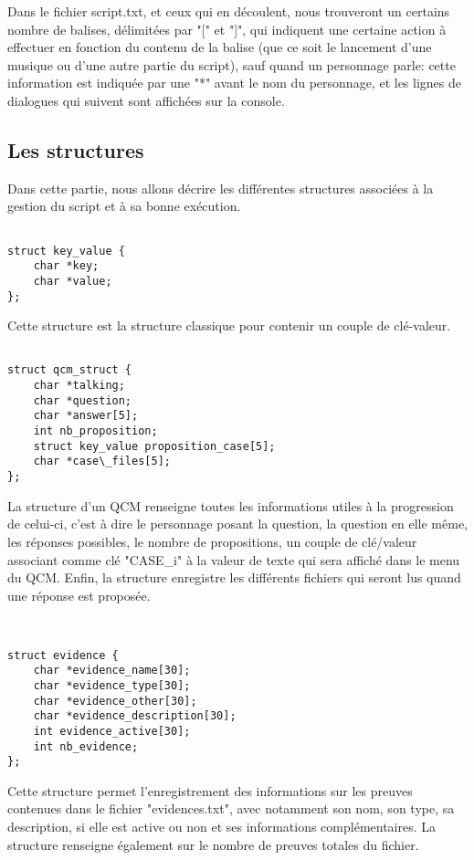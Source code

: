 	Dans le fichier script.txt, et ceux qui en découlent, nous trouveront un certains nombre de balises, délimitées par "[" et "]", qui indiquent une certaine action à effectuer en fonction du contenu de la balise (que ce soit le lancement d'une musique ou d'une autre partie du script), sauf quand un personnage parle: cette information est indiquée par une "*" avant le nom du personnage, et les lignes de dialogues qui suivent sont affichées sur la console.


\subsection{Les structures}

	Dans cette partie, nous allons décrire les différentes structures associées à la gestion du script et à sa bonne exécution.

\begin{verbatim}

struct key_value {
	char *key;
	char *value;
};
\end{verbatim}

	Cette structure est la structure classique pour contenir un couple de clé-valeur.

\begin{verbatim}

struct qcm_struct {
	char *talking;
	char *question;
	char *answer[5];
	int nb_proposition;
	struct key_value proposition_case[5];
	char *case\_files[5];
};
\end{verbatim}

	La structure d'un QCM renseigne toutes les informations utiles à la progression de celui-ci, c'est à dire le personnage posant la question, la question en elle même, les réponses possibles, le nombre de propositions, un couple de clé/valeur associant comme clé "CASE\_i" à la valeur de texte qui sera affiché dans le menu du QCM. Enfin, la structure enregistre les différents fichiers qui seront lus quand une réponse est proposée.

\begin{verbatim}


struct evidence {
	char *evidence_name[30];
	char *evidence_type[30];
	char *evidence_other[30];
	char *evidence_description[30];
	int evidence_active[30];
	int nb_evidence;
};
\end{verbatim}

	Cette structure permet l'enregistrement des informations sur les preuves contenues dans le fichier "evidences.txt", avec notamment son nom, son type, sa description, si elle est active ou non et ses informations complémentaires. La structure renseigne également sur le nombre de preuves totales du fichier.

